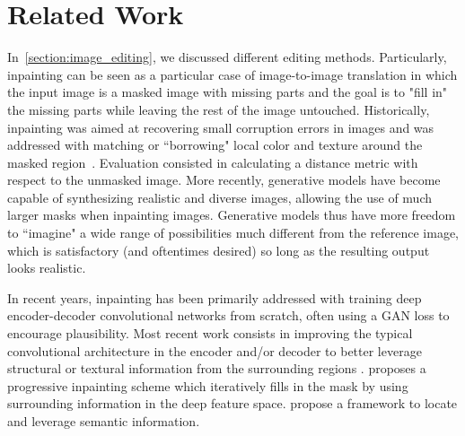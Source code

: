 


\section{Related Work}


In~\ref{section:image_editing}, we discussed different editing methods. Particularly, inpainting can be 
seen as a particular case of image-to-image translation  in which the input image is a masked image with 
missing parts and the goal is to "fill in" the missing parts while leaving the rest of the image 
untouched. Historically, inpainting was aimed at recovering small corruption errors in images and 
was addressed with matching or ``borrowing" local color and texture around the masked
 region~\citep{poisson, patch_based}. Evaluation consisted in calculating a distance
  metric with respect to the unmasked image. More recently, generative models have 
  become capable of synthesizing realistic and diverse images, allowing the use of much
   larger masks when inpainting images. Generative models thus have more freedom 
   to ``imagine" a wide range of possibilities much different from the reference image,
    which is satisfactory (and oftentimes desired) so long as the resulting output looks
     realistic. 

In recent years, inpainting has been primarily addressed with training deep 
encoder-decoder convolutional networks from scratch, often using a 
GAN\citep{goodfellowgans} loss to encourage plausibility. Most recent work consists in 
improving the typical convolutional architecture in the encoder and/or decoder to better
 leverage structural or textural information from the surrounding regions 
 \cite{lama, hong2019deep, yu2020region, hukkelaas2020image, yang2020learning, zhu2021image, liu2018image, ma2022regionwise, zheng2022cm}. 
 \cite{li2020recurrent} proposes a progressive inpainting scheme which iteratively 
 fills in the mask by using surrounding information in the deep feature space.  
 \cite{xiong2019foreground, liao2020guidance} propose a framework to locate and 
 leverage semantic information.


